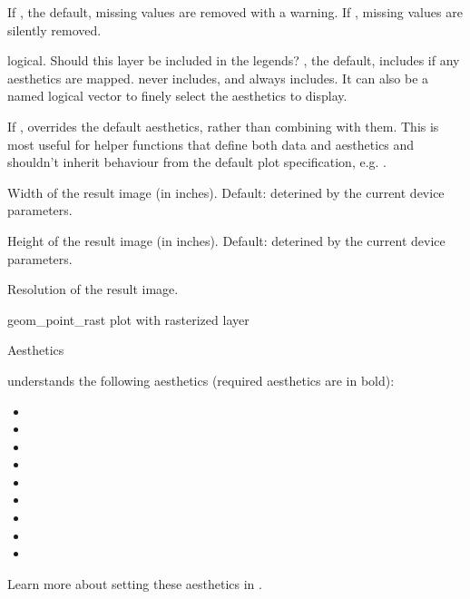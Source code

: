 \documentclass[a4paper]{book}
\begin{document}
\begin{Arguments}
\begin{ldescription}
\item[\code{na.rm}] If , the default, missing values are removed with
a warning. If , missing values are silently removed.

\item[\code{show.legend}] logical. Should this layer be included in the legends?
, the default, includes if any aesthetics are mapped.
 never includes, and  always includes.
It can also be a named logical vector to finely select the aesthetics to
display.

\item[\code{inherit.aes}] If , overrides the default aesthetics,
rather than combining with them. This is most useful for helper functions
that define both data and aesthetics and shouldn't inherit behaviour from
the default plot specification, e.g. .

\item[\code{raster.width}] Width of the result image (in inches). Default: deterined by the current device parameters.

\item[\code{raster.height}] Height of the result image (in inches). Default: deterined by the current device parameters.

\item[\code{raster.dpi}] Resolution of the result image.
\end{ldescription}
\end{Arguments}
%
\begin{Value}
geom\_point\_rast plot with rasterized layer
\end{Value}
%
\begin{Section}{Aesthetics}


 understands the following aesthetics (required aesthetics are in bold):
\begin{itemize}

\item{} 
\item{} 
\item{} 
\item{} 
\item{} 
\item{} 
\item{} 
\item{} 
\item{} 

\end{itemize}

Learn more about setting these aesthetics in .

\end{Section}
\end{document}
